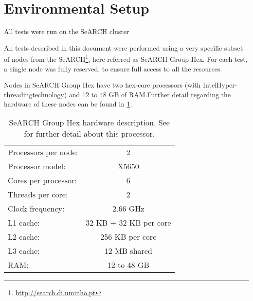 \section{Environmental Setup}
\label{sec:600}

All tests were run on the SeARCH cluster

All tests described in this document were performed using a very specific subset of nodes from the SeARCH\footnote{\url{http://search.di.uminho.pt}}, here referred as SeARCH Group Hex.
For each test, a single node was fully reserved, to ensure full access to all the resources.

Nodes in SeARCH Group Hex have two hex-core processors (with Intel\tr Hyper-threading\tm technology) and 12 to 48 GB of RAM.Further detail regarding the hardware of these nodes can be found in \cref{tab:grouphex}.


\begin{table}[!htp]
	\begin{center}
		\begin{tabular}{lc}
			\hline
			Processors per node: & 2	\\
			Processor model: & \intel\xeon X5650\\
			Cores per processor: & 6	\\
			Threads per core: & 2	\\
			Clock frequency: & 2.66 GHz	\\
			\hline
			L1 cache: & 32 KB + 32 KB per core	\\
			L2 cache: & 256 KB per core	\\
			L3 cache: & 12 MB shared	\\
			RAM: & 12 to 48 GB	\\
			\hline
		\end{tabular}
		\caption[SeARCH Group Hex hardware description]{SeARCH Group Hex hardware description. See \cite{xeon5600} for further detail about this processor.}
		\label{tab:grouphex}
	\end{center}
\end{table}